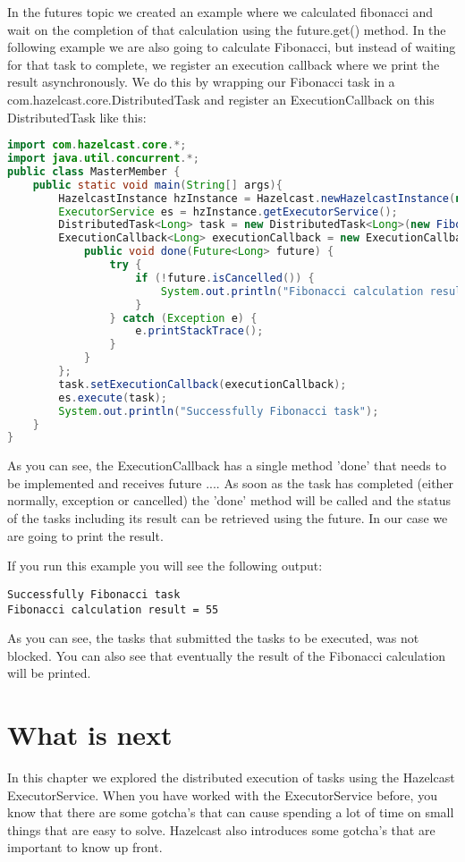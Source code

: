 In the futures topic we created an example where we calculated fibonacci and wait on the completion of that calculation using the future.get() method. In the following example we are also going to calculate Fibonacci, but instead of waiting for that task to complete, we register an execution callback where we print the result asynchronously. We do this by wrapping our Fibonacci task in a com.hazelcast.core.DistributedTask and register an ExecutionCallback on this DistributedTask like this:
\begin{lstlisting}[language=java]
import com.hazelcast.core.*;
import java.util.concurrent.*;
public class MasterMember {
    public static void main(String[] args){
        HazelcastInstance hzInstance = Hazelcast.newHazelcastInstance(null);
        ExecutorService es = hzInstance.getExecutorService();
        DistributedTask<Long> task = new DistributedTask<Long>(new FibonacciCallable(10));
        ExecutionCallback<Long> executionCallback = new ExecutionCallback<Long>() {
            public void done(Future<Long> future) {
                try {
                    if (!future.isCancelled()) {
                        System.out.println("Fibonacci calculation result = " + future.get());
                    }
                } catch (Exception e) {
                    e.printStackTrace();
                }
            }
        };
        task.setExecutionCallback(executionCallback);
        es.execute(task);
        System.out.println("Successfully Fibonacci task");
    }
}
\end{lstlisting}
As you can see, the ExecutionCallback has a single method 'done' that needs to be implemented and receives future .... As soon as the task has completed (either normally, exception or cancelled) the 'done' method will be called and the status of the tasks including its result can be retrieved using the future. In our case we are going to print the result.

If you run this example you will see the following output:
\begin{lstlisting}
Successfully Fibonacci task
Fibonacci calculation result = 55
\end{lstlisting}
As you can see, the tasks that submitted the tasks to be executed, was not blocked. You can also see that eventually the result of the Fibonacci calculation will be printed. 



\section{What is next}
In this chapter we explored the distributed execution of tasks using the Hazelcast ExecutorService. When you have worked with the ExecutorService before, you know that there are some gotcha's that can cause spending a lot of time on small things that are easy to solve. Hazelcast also introduces some gotcha's that are important to know up front.

